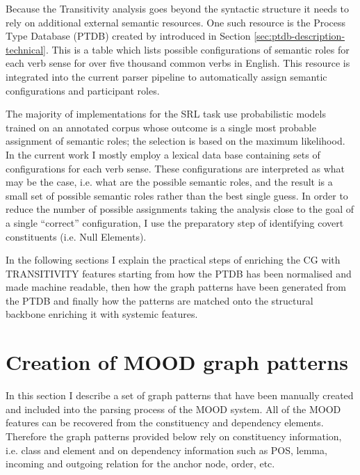     Because the Transitivity analysis goes beyond the syntactic structure it needs to rely on additional external semantic resources. One such resource is the Process Type Database (PTDB) created by \citet{Neale2002} introduced in Section \ref{sec:ptdb-description-technical}. This is a table which lists possible configurations of semantic roles for each verb sense for over five thousand common verbs in English. This resource is integrated into the current parser pipeline to automatically assign semantic configurations and participant roles.


    The majority of implementations for the SRL task use probabilistic models trained on an annotated corpus whose outcome is a single most probable assignment of semantic roles; the selection is based on the maximum likelihood. In the current work I mostly employ a lexical data base containing sets of configurations for each verb sense. These configurations are interpreted as what may be the case, i.e. what are the possible semantic roles, and the result is a small set of possible semantic roles rather than the best single guess. In order to reduce the number of possible assignments taking the analysis close to the goal of a single ``correct'' configuration, I use the preparatory step of identifying covert constituents (i.e. Null Elements).

    In the following sections I explain the practical steps of enriching the CG with TRANSITIVITY features starting from how the PTDB has been normalised and made machine readable, then how the graph patterns have been generated from the PTDB and finally how the patterns are matched onto the structural backbone enriching it with systemic features.



\section{Creation of MOOD graph patterns}
\label{sec:mood-patterns}
    In this section I describe a set of graph patterns that have been manually created and included into the parsing process of the MOOD system. All of the MOOD features can be recovered from the constituency and dependency elements. Therefore the graph patterns provided below rely on constituency information, i.e. class and element and on dependency information such as POS, lemma, incoming and outgoing relation for the anchor node, order, etc. 

